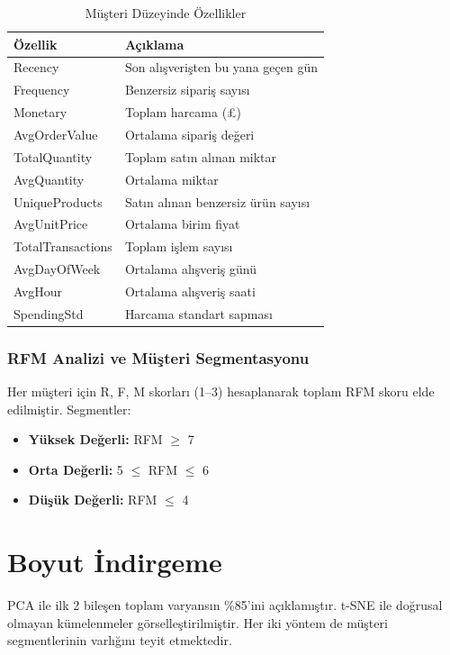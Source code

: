 \documentclass[conference]{IEEEtran}
\begin{document}
\begin{table}[h]
\centering
\caption{Müşteri Düzeyinde Özellikler}
\label{tab:cust_features}
\begin{tabular}{p{2.8cm}p{4.8cm}}
\toprule
\textbf{Özellik} & \textbf{Açıklama} \\
\midrule
Recency & Son alışverişten bu yana geçen gün \\
Frequency & Benzersiz sipariş sayısı \\
Monetary & Toplam harcama (£) \\
AvgOrderValue & Ortalama sipariş değeri \\
TotalQuantity & Toplam satın alınan miktar \\
AvgQuantity & Ortalama miktar \\
UniqueProducts & Satın alınan benzersiz ürün sayısı \\
AvgUnitPrice & Ortalama birim fiyat \\
TotalTransactions & Toplam işlem sayısı \\
AvgDayOfWeek & Ortalama alışveriş günü \\
AvgHour & Ortalama alışveriş saati \\
SpendingStd & Harcama standart sapması \\
\bottomrule
\end{tabular}
\end{table}

\subsubsection{RFM Analizi ve Müşteri Segmentasyonu}
Her müşteri için R, F, M skorları (1--3) hesaplanarak toplam RFM skoru elde edilmiştir. Segmentler:
\begin{itemize}[leftmargin=*]
    \item \textbf{Yüksek Değerli:} RFM $\geq$ 7
    \item \textbf{Orta Değerli:} 5 $\leq$ RFM $\leq$ 6
    \item \textbf{Düşük Değerli:} RFM $\leq$ 4
\end{itemize}

\section{Boyut İndirgeme}

PCA ile ilk 2 bileşen toplam varyansın \%85'ini açıklamıştır. t-SNE ile doğrusal olmayan kümelenmeler görselleştirilmiştir. Her iki yöntem de müşteri segmentlerinin varlığını teyit etmektedir.
\end{document}
